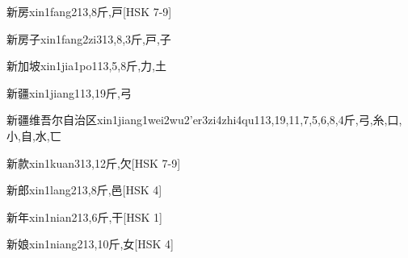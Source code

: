 \begin{EntryWithPhonetic}{新房}{xin1fang2}{13,8}{⽄,⼾}[HSK 7-9]
\end{EntryWithPhonetic}

\begin{EntryWithPhonetic}{新房子}{xin1fang2zi3}{13,8,3}{⽄,⼾,⼦}
\end{EntryWithPhonetic}

\begin{EntryWithPhonetic}{新加坡}{xin1jia1po1}{13,5,8}{⽄,⼒,⼟}
\end{EntryWithPhonetic}

\begin{EntryWithPhonetic}{新疆}{xin1jiang1}{13,19}{⽄,⼸}
\end{EntryWithPhonetic}

\begin{EntryWithPhonetic}{新疆维吾尔自治区}{xin1jiang1wei2wu2'er3zi4zhi4qu1}{13,19,11,7,5,6,8,4}{⽄,⼸,⽷,⼝,⼩,⾃,⽔,⼖}
\end{EntryWithPhonetic}

\begin{EntryWithPhonetic}{新款}{xin1kuan3}{13,12}{⽄,⽋}[HSK 7-9]
\end{EntryWithPhonetic}

\begin{EntryWithPhonetic}{新郎}{xin1lang2}{13,8}{⽄,⾢}[HSK 4]
\end{EntryWithPhonetic}

\begin{EntryWithPhonetic}{新年}{xin1nian2}{13,6}{⽄,⼲}[HSK 1]
\end{EntryWithPhonetic}

\begin{EntryWithPhonetic}{新娘}{xin1niang2}{13,10}{⽄,⼥}[HSK 4]
\end{EntryWithPhonetic}

